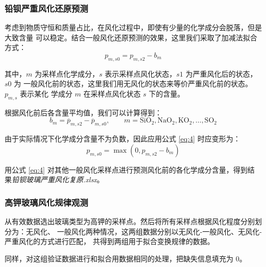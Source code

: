 \documentclass[withoutpreface,bwprint]{cumcmthesis} %
\begin{document}
\subsubsection{铅钡严重风化还原预测}
考虑到物质守恒和质量占比，在风化过程中，即使有少量的化学成分会脱落，但是大致含量
可以稳定。结合一般风化还原预测的效果，这里我们采取了加减法拟合方式：
\begin{equation}
    p_{m,s0}=p_{m,s2}-b_m
    \label{eq:4}
\end{equation}

其中，$m$ 为采样点化学成分，$s$ 表示采样点风化状态，$s1$ 为严重风化后的状态，$s0$ 为
一般风化前的状态，这里我们用无风化的状态来等价严重风化前的状态。$p_{m,s}$ 表示某化
学成分 $m$ 在采样点风化状态 $s$ 下的含量。

根据风化前后各含量平均值，我们可以计算得到：
\begin{equation*}
    b_m=\overline{p}_{m,s2}-\overline{p}_{m,s0},\qquad
    m=\mathrm{SiO_2,NaO_2,KO_2,\dots,SO_2}
\end{equation*}

由于实际情况下化学成分含量不为负数，因此应用公式 \eqref{eq:4} 时应变形为：
\[
    p_{m,s0}=\max(0,p_{m,s2}-b_m)
\]

用公式 \eqref{eq:4} 对其他一般风化采样点进行预测风化前的各化学成分含量，得到结
果\emph{铅钡玻璃严重风化复原.xlsx}。

\subsubsection{高钾玻璃风化规律观测}
从有效数据选出玻璃类型为高钾的采样点。然后将所有采样点根据风化程度分别划分为：无风化、
一般风化两种情况，这两组数据分别以无风化-一般风化、无风化-严重风化的方式进行匹配，
共得到两组用于拟合变换规律的数据。

同样，对这组验证数据进行和拟合用数据相同的处理，把缺失信息填充为 0。
\end{document}
